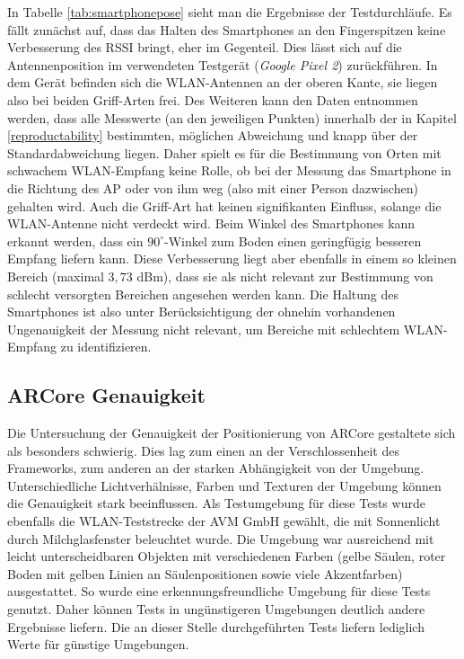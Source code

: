 \documentclass[10pt]{scrartcl}
\begin{document}
In Tabelle \ref{tab:smartphonepose} sieht man die Ergebnisse der Testdurchläufe. Es fällt zunächst auf, dass das Halten des Smartphones an den Fingerspitzen keine Verbesserung des RSSI bringt, eher im Gegenteil. Dies lässt sich auf die Antennenposition im verwendeten Testgerät (\textit{Google Pixel 2}) zurückführen. In dem Gerät befinden sich die WLAN-Antennen an der oberen Kante, sie liegen also bei beiden Griff-Arten frei. Des Weiteren kann den Daten entnommen werden, dass alle Messwerte (an den jeweiligen Punkten) innerhalb der in Kapitel \ref{reproductability} bestimmten, möglichen Abweichung und knapp über der Standardabweichung liegen. Daher spielt es für die Bestimmung von Orten mit schwachem WLAN-Empfang keine Rolle, ob bei der Messung das Smartphone in die Richtung des AP oder von ihm weg (also mit einer Person dazwischen) gehalten wird. Auch die Griff-Art hat keinen signifikanten Einfluss, solange die WLAN-Antenne nicht verdeckt wird. Beim Winkel des Smartphones kann erkannt werden, dass ein $90^\circ$-Winkel zum Boden einen geringfügig besseren Empfang liefern kann. Diese Verbesserung liegt aber ebenfalls in einem so kleinen Bereich (maximal $3,73$ dBm), dass sie als nicht relevant zur Bestimmung von schlecht versorgten Bereichen angesehen werden kann. Die Haltung des Smartphones ist also unter Berücksichtigung der ohnehin vorhandenen Ungenauigkeit der Messung nicht relevant, um Bereiche mit schlechtem WLAN-Empfang zu identifizieren.

\subsection{ARCore Genauigkeit}
\label{arcoreaccuracytest}
Die Untersuchung der Genauigkeit der Positionierung von ARCore gestaltete sich als besonders schwierig. Dies lag zum einen an der Verschlossenheit des Frameworks, zum anderen an der starken Abhängigkeit von der Umgebung. Unterschiedliche Lichtverhälnisse, Farben und Texturen der Umgebung können die Genauigkeit stark beeinflussen. Als Testumgebung für diese Tests wurde ebenfalls die WLAN-Teststrecke der AVM GmbH gewählt, die mit Sonnenlicht durch Milchglasfenster beleuchtet wurde. Die Umgebung war ausreichend mit leicht unterscheidbaren Objekten mit verschiedenen Farben (gelbe Säulen, roter Boden mit gelben Linien an Säulenpositionen sowie viele Akzentfarben) ausgestattet. So wurde eine erkennungsfreundliche Umgebung für diese Tests genutzt. Daher können Tests in ungünstigeren Umgebungen deutlich andere Ergebnisse liefern. Die an dieser Stelle durchgeführten Tests liefern lediglich Werte für günstige Umgebungen.
\end{document}
